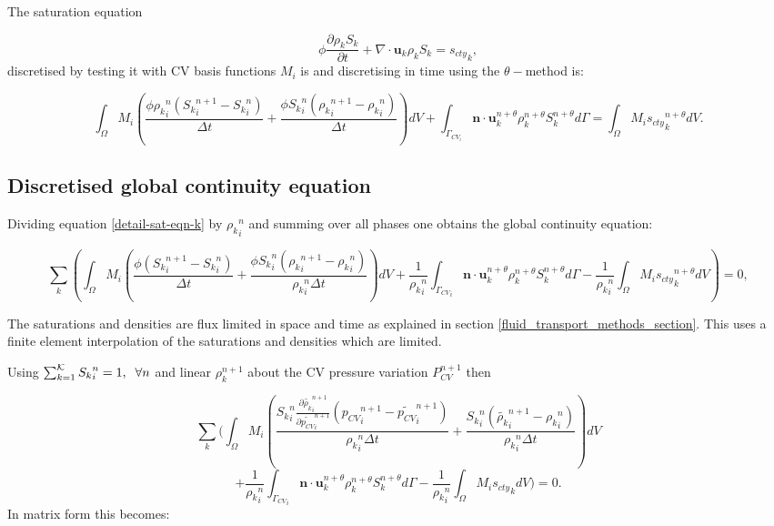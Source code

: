 The saturation equation 

\begin{equation}
\phi\frac{\partial \rho_k S_k }{\partial t} 
+ \nabla \cdot {\mathbf u}_k \rho_k S_k = {s_{cty}}_k, 
\end{equation}
discretised by testing it with CV basis functions 
 $M_i$ is and discretising in time using the 
 $\theta-$method is:
 
\begin{equation}
\int_\Omega M_i (\frac{\phi{\rho_k}_i^n ({S_k}_i^{n+1}-{S_k}_i^n) }{\Delta t} 
+ \frac{\phi{S_k}_i^n( {\rho_k}_i^{n+1}-{\rho_k}_i^n)} {\Delta t} ) dV
+ \int_{\Gamma_{CV_i}} {\mathbf n} \cdot {\mathbf u}_k^{n+\theta} \rho_k^{n+\theta} S_k^{n+\theta} 
d\Gamma 
= \int_\Omega M_i {s_{cty}}_k^{n+\theta} dV.
\label{detail-sat-eqn-k}
\end{equation}
 
 
\subsection{Discretised global continuity equation} 
 
Dividing equation \ref{detail-sat-eqn-k} by ${\rho_k}^n_i $ and summing 
over all phases one obtains the global continuity equation: 

 
\begin{equation}
 \sum_k \left(
\int_\Omega M_i (\frac{ \phi({S_k}_i^{n+1}-{S_k}_i^n) }{\Delta t} 
+ \frac{\phi{S_k}_i^n( {\rho_k}_i^{n+1}-{\rho_k}_i^n)} {{\rho_k}_i^n\Delta t} ) dV
+ \frac{1}{{\rho_k}_i^n}\int_{{\Gamma_{CV}}_i} 
{\mathbf n} \cdot {\mathbf u}_k^{n+\theta} \rho_k^{n+\theta}   S_k^{n+\theta} d\Gamma
- \frac{1}{{\rho_k}_i^n} \int_\Omega M_i {s_{cty}}_k^{n+\theta} dV \right) =0,
\label{detail-sat-eqn-k-sum}
\end{equation}

The saturations and densities are flux limited in space and 
time as explained in section \ref{fluid_transport_methods_section}. This uses a finite element 
interpolation of the saturations and densities which are limited. 
			


Using $\sum_{k=1}^{\cal K} {S_k}_i^n =1, \;\; \forall n$ and linear 
$\rho_k^{n+1}$ about the CV pressure variation $P_{CV}^{n+1}$ then 

\begin{equation}
 \sum_k ( \int_{\Omega} M_i 
( \frac{{S_k}_i^n \frac{\partial \tilde{\rho_k}_i^{n+1}}{\partial \tilde{ p_{CV}}_i^{n+1}}({p_{CV}}_i^{n+1}-\tilde{p_{CV}}_i^{n+1})
} {{\rho_k}_i^n\Delta t} 
+ \frac{{S_k}_i^n( \tilde{\rho_k}_i^{n+1}-{\rho_k}_i^n)} 
{{\rho_k}_i^n \Delta t} ) dV
\end{equation}
\begin{equation}
+ \frac{1}{{\rho_k}_i^n}\int_{{\Gamma_{CV}}_i} {\mathbf n} \cdot {\mathbf u}_k^{n+\theta} \rho_k^{n+\theta} S_k^{n+\theta} d\Gamma
- \frac{1}{{\rho_k}_i^n} \int_\Omega M_i {s_{cty}}_k dV ) =0.
\label{detail-global-cty}
\end{equation}
In matrix form this becomes:

